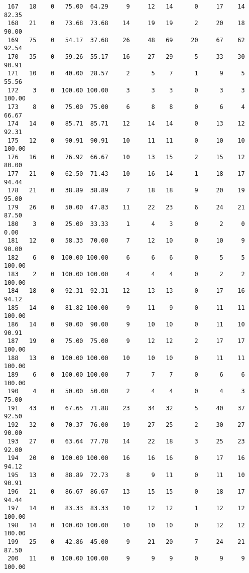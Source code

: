 \begin{verbatim}
 167   18    0   75.00  64.29     9     12   14      0     17    14    82.35
 168   21    0   73.68  73.68    14     19   19      2     20    18    90.00
 169   75    0   54.17  37.68    26     48   69     20     67    62    92.54
 170   35    0   59.26  55.17    16     27   29      5     33    30    90.91
 171   10    0   40.00  28.57     2      5    7      1      9     5    55.56
 172    3    0  100.00 100.00     3      3    3      0      3     3   100.00
 173    8    0   75.00  75.00     6      8    8      0      6     4    66.67
 174   14    0   85.71  85.71    12     14   14      0     13    12    92.31
 175   12    0   90.91  90.91    10     11   11      0     10    10   100.00
 176   16    0   76.92  66.67    10     13   15      2     15    12    80.00
 177   21    0   62.50  71.43    10     16   14      1     18    17    94.44
 178   21    0   38.89  38.89     7     18   18      9     20    19    95.00
 179   26    0   50.00  47.83    11     22   23      6     24    21    87.50
 180    3    0   25.00  33.33     1      4    3      0      2     0     0.00
 181   12    0   58.33  70.00     7     12   10      0     10     9    90.00
 182    6    0  100.00 100.00     6      6    6      0      5     5   100.00
 183    2    0  100.00 100.00     4      4    4      0      2     2   100.00
 184   18    0   92.31  92.31    12     13   13      0     17    16    94.12
 185   14    0   81.82 100.00     9     11    9      0     11    11   100.00
 186   14    0   90.00  90.00     9     10   10      0     11    10    90.91
 187   19    0   75.00  75.00     9     12   12      2     17    17   100.00
 188   13    0  100.00 100.00    10     10   10      0     11    11   100.00
 189    6    0  100.00 100.00     7      7    7      0      6     6   100.00
 190    4    0   50.00  50.00     2      4    4      0      4     3    75.00
 191   43    0   67.65  71.88    23     34   32      5     40    37    92.50
 192   32    0   70.37  76.00    19     27   25      2     30    27    90.00
 193   27    0   63.64  77.78    14     22   18      3     25    23    92.00
 194   20    0  100.00 100.00    16     16   16      0     17    16    94.12
 195   13    0   88.89  72.73     8      9   11      0     11    10    90.91
 196   21    0   86.67  86.67    13     15   15      0     18    17    94.44
 197   14    0   83.33  83.33    10     12   12      1     12    12   100.00
 198   14    0  100.00 100.00    10     10   10      0     12    12   100.00
 199   25    0   42.86  45.00     9     21   20      7     24    21    87.50
 200   11    0  100.00 100.00     9      9    9      0      9     9   100.00

\end{verbatim}
